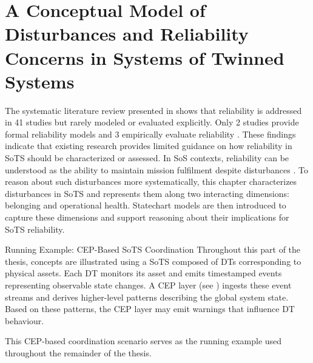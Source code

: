 \chapter{A Conceptual Model of Disturbances and Reliability Concerns in Systems of Twinned Systems}\label{ch:reliable-sots}

The systematic literature review presented in  shows that reliability is addressed in 41 studies  but rarely modeled or evaluated explicitly. Only 2 studies  provide formal reliability models and 3 empirically evaluate reliability . These findings indicate that existing research provides limited guidance on how reliability in SoTS should be characterized or assessed. 
In SoS contexts, reliability can be understood as the ability to maintain mission fulfilment despite disturbances \cite{ferreira2023towards}. To reason about such disturbances more systematically, this chapter characterizes disturbances in SoTS and represents them along two interacting dimensions: belonging and operational health. Statechart models are then introduced to capture these dimensions and support reasoning about their implications for SoTS reliability.


\begin{runningexample}{Running Example: CEP-Based SoTS Coordination}
Throughout this part of the thesis, concepts are illustrated using a SoTS composed of DTs corresponding to physical assets. Each DT monitors its asset and emits timestamped events representing observable state changes. A CEP layer (see ) ingests these event streams and derives higher-level patterns describing the global system state. Based on these patterns, the CEP layer may emit warnings that influence DT behaviour.

\begin{center}

\end{center}

This CEP-based coordination scenario serves as the running example used throughout the remainder of the thesis.
\end{runningexample}

